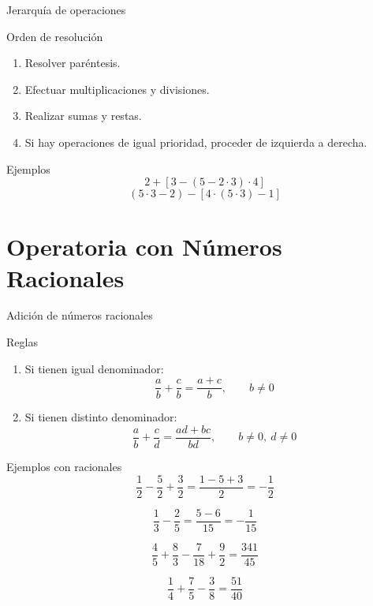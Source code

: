 \documentclass[handout,aspectratio=169,10pt]{beamer}
\begin{document}
	\begin{frame}{Jerarquía de operaciones}
		\begin{block}{Orden de resolución}
			\begin{enumerate}[<+->]
				\item Resolver paréntesis.
				\item Efectuar multiplicaciones y divisiones.
				\item Realizar sumas y restas.
				\item Si hay operaciones de igual prioridad, proceder de izquierda a derecha.
			\end{enumerate}
		\end{block}
		
		\begin{exampleblock}{Ejemplos}
			\[
			2+[3-(5-2\cdot3)\cdot4]
			\]
			\[
			(5\cdot3-2)-[4\cdot(5\cdot3)-1]
			\]
		\end{exampleblock}
	\end{frame}
	
	\section{Operatoria con Números Racionales}
	
	\begin{frame}{Adición de números racionales}
		\begin{block}{Reglas}
			\begin{enumerate}[<+->]
				\item Si tienen igual denominador:
				\[
				\frac{a}{b}+\frac{c}{b}=\frac{a+c}{b},\qquad b\neq0
				\]
				\item Si tienen distinto denominador:
				\[
				\frac{a}{b}+\frac{c}{d}=\frac{ad+bc}{bd},\qquad b\neq0,\ d\neq0
				\]
			\end{enumerate}
		\end{block}
	\end{frame}
	
	\begin{frame}{Ejemplos con racionales}
		\[
		\frac12-\frac52+\frac32=\frac{1-5+3}{2}=-\frac12
		\]
		
		\vspace{0.3cm}
		
		\[
		\frac13-\frac25=\frac{5-6}{15}=-\frac1{15}
		\]
		
		\vspace{0.3cm}
		
		\[
		\frac45+\frac83-\frac7{18}+\frac92=\frac{341}{45}
		\]
		
		\vspace{0.3cm}
		
		\[
		\frac14+\frac75-\frac38=\frac{51}{40}
		\]
	\end{frame}
	
\end{document}
